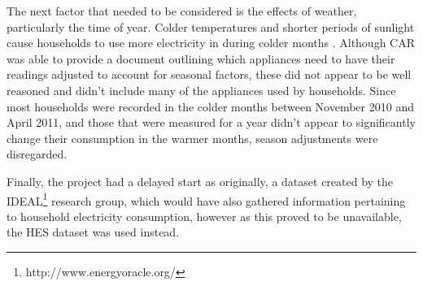 The next factor that needed to be considered is the effects of weather, particularly the time of year. Colder temperatures and shorter periods of sunlight cause households to use more electricity in during colder months \cite{DECC}. Although CAR was able to provide a document outlining which appliances need to have their readings adjusted to account for seasonal factors, these did not appear to be well reasoned and didn't include many of the appliances used by households. Since most households were recorded in the colder months between November 2010 and April 2011, and those that were measured for a year didn't appear to significantly change their consumption in the warmer months, season adjustments were disregarded.

Finally, the project had a delayed start as originally, a dataset created by the IDEAL\footnote{http://www.energyoracle.org/} research group, which would have also gathered information pertaining to household electricity consumption, however as this proved to be unavailable, the HES dataset was used instead.






